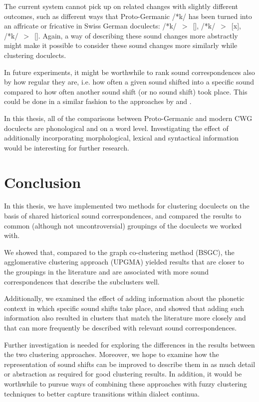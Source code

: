 \documentclass[a4paper]{article}
\begin{document}

The current system cannot pick up on related changes
with slightly different outcomes, such as different
ways that Proto-Germanic /*k/ has been turned into
an affricate or fricative in Swiss German doculects:
/*k/~$>$~[], /*k/~$>$~[x], /*k/~$>$~[\textchi].
Again, a way of describing these sound changes more abstractly
might make it possible to consider these sound changes more
similarly while clustering doculects.

In future experiments, it might be worthwhile to rank
sound correspondences also by how regular they are,
i.e. how often a given sound shifted into a specific sound
compared to how often another sound shift (or no sound shift) took place.
This could be done in a similar fashion to the approaches by
\citet{prokic2007identifying} and \citet{prokic2013combining}.

In this thesis, all of the comparisons between Proto-Germanic
and modern CWG doculects are phonological
and on a word level.
Investigating the effect of additionally incorporating
morphological, lexical and syntactical information
would be interesting for further research.

\section{Conclusion}
\label{sec:conclusion}

In this thesis, we have implemented two methods
for clustering doculects on the basis of shared
historical sound correspondences,
and compared the results to common (although not uncontroversial)
groupings of the doculects we worked with.

We showed that, compared to the graph co-clustering method (BSGC),
the agglomerative clustering approach (UPGMA)
yielded results that are closer to the groupings in the literature
and are associated with more sound correspondences that
describe the subclusters well.

Additionally, we examined the effect of adding information about
the phonetic context in which specific sound shifts take place,
and showed that adding such information also resulted in
clusters that match the literature more closely and that
can more frequently be described with relevant sound correspondences.

Further investigation is needed for exploring the
differences in the results between the two clustering approaches.
Moreover, we hope to examine how the representation of
sound shifts can be improved to describe them in
as much detail or abstraction as required for good clustering results.
In addition, it would be worthwhile to pursue ways
of combining these approaches with fuzzy clustering techniques
to better capture transitions within dialect continua.



\end{document}
